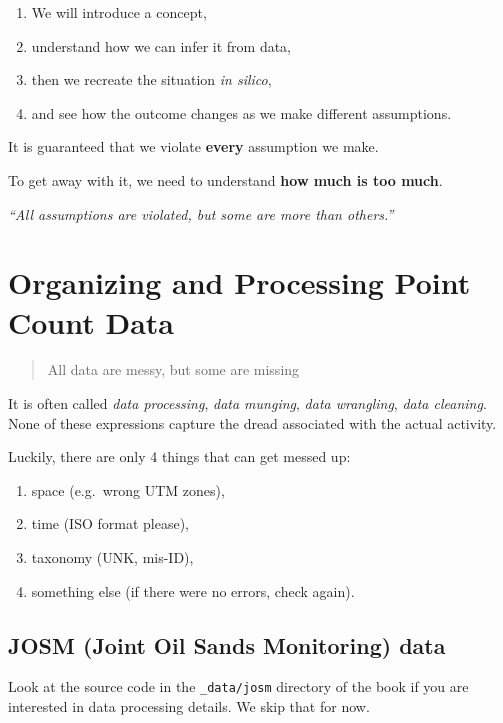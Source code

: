 \documentclass[12pt,]{book}
\providecommand{\tightlist}{%
  \setlength{\itemsep}{0pt}\setlength{\parskip}{0pt}}
\begin{document}
\begin{enumerate}
\def\labelenumi{\arabic{enumi}.}
\tightlist
\item
  We will introduce a concept,
\item
  understand how we can infer it from data,
\item
  then we recreate the situation \emph{in silico},
\item
  and see how the outcome changes as we make different assumptions.
\end{enumerate}

It is guaranteed that we violate \textbf{every} assumption we make.

To get away with it, we need to understand \textbf{how much is too much}.

\emph{``All assumptions are violated, but some are more than others.''}

\hypertarget{pcdata}{%
\chapter{Organizing and Processing Point Count Data}\label{pcdata}}

\begin{quote}
All data are messy, but some are missing
\end{quote}

It is often called \emph{data processing}, \emph{data munging},
\emph{data wrangling}, \emph{data cleaning}.
None of these expressions capture the dread associated with the actual activity.

Luckily, there are only 4 things that can get messed up:

\begin{enumerate}
\def\labelenumi{\arabic{enumi}.}
\tightlist
\item
  space (e.g.~wrong UTM zones),
\item
  time (ISO format please),
\item
  taxonomy (UNK, mis-ID),
\item
  something else (if there were no errors, check again).
\end{enumerate}

\hypertarget{josm-joint-oil-sands-monitoring-data}{%
\section{JOSM (Joint Oil Sands Monitoring) data}\label{josm-joint-oil-sands-monitoring-data}}

Look at the source code in the \texttt{\_data/josm} directory of the book
if you are interested in data processing details.
We skip that for now.
\end{document}
